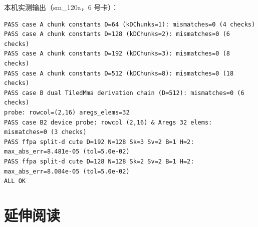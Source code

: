 本机实测输出（sm\_120a，6 号卡）：

{\scriptsize
\begin{lstlisting}[style=console]
PASS case A chunk constants D=64 (kDChunks=1): mismatches=0 (4 checks)
PASS case A chunk constants D=128 (kDChunks=2): mismatches=0 (6 checks)
PASS case A chunk constants D=192 (kDChunks=3): mismatches=0 (8 checks)
PASS case A chunk constants D=512 (kDChunks=8): mismatches=0 (18 checks)
PASS case B dual TiledMma derivation chain (D=512): mismatches=0 (6 checks)
probe: rowcol=(2,16) aregs_elems=32
PASS case B2 device probe: rowcol (2,16) & Aregs 32 elems: mismatches=0 (3 checks)
PASS ffpa split-d cute D=192 N=128 Sk=3 Sv=2 B=1 H=2: max_abs_err=8.481e-05 (tol=5.0e-02)
PASS ffpa split-d cute D=128 N=128 Sk=2 Sv=2 B=1 H=2: max_abs_err=8.084e-05 (tol=5.0e-02)
ALL OK
\end{lstlisting}
}

\section*{延伸阅读}

